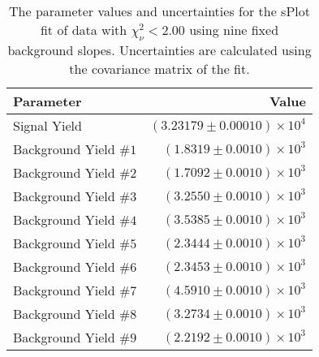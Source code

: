 
\begin{table}[ht]
    \begin{center}
        \begin{tabular}{lr}\toprule
            Parameter & Value \\\midrule
            Signal Yield & $(3.23179 \pm 0.00010) \times 10^{4}$ \\
            Background Yield $\#1$ & $(1.8319 \pm 0.0010) \times 10^{3}$ \\
            Background Yield $\#2$ & $(1.7092 \pm 0.0010) \times 10^{3}$ \\
            Background Yield $\#3$ & $(3.2550 \pm 0.0010) \times 10^{3}$ \\
            Background Yield $\#4$ & $(3.5385 \pm 0.0010) \times 10^{3}$ \\
            Background Yield $\#5$ & $(2.3444 \pm 0.0010) \times 10^{3}$ \\
            Background Yield $\#6$ & $(2.3453 \pm 0.0010) \times 10^{3}$ \\
            Background Yield $\#7$ & $(4.5910 \pm 0.0010) \times 10^{3}$ \\
            Background Yield $\#8$ & $(3.2734 \pm 0.0010) \times 10^{3}$ \\
            Background Yield $\#9$ & $(2.2192 \pm 0.0010) \times 10^{3}$ \\\bottomrule
        \end{tabular}
        \caption{The parameter values and uncertainties for the sPlot fit of data with $\chi^2_\nu < 2.00$ using nine fixed background slopes. Uncertainties are calculated using the covariance matrix of the fit.}\label{tab:splot-fit-results-chisqdof-2.00-fixed-9}
    \end{center}
\end{table}

